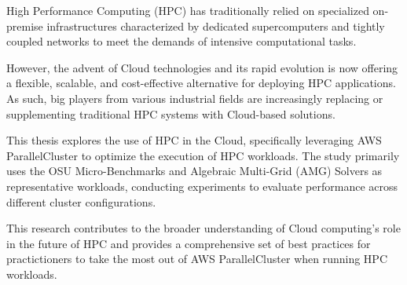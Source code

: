 %
%

High Performance Computing (HPC) has traditionally relied on specialized on-premise infrastructures characterized by dedicated supercomputers and tightly coupled networks to meet the demands of intensive computational tasks.

However, the advent of Cloud technologies and its rapid evolution is now offering a flexible, scalable, and cost-effective alternative for deploying HPC applications.
As such, big players from various industrial fields are increasingly replacing or supplementing traditional HPC systems with Cloud-based solutions.

This thesis explores the use of HPC in the Cloud, specifically leveraging AWS ParallelCluster to optimize the execution of HPC workloads.
The study primarily uses the OSU Micro-Benchmarks and Algebraic Multi-Grid (AMG) Solvers as representative workloads, conducting experiments to evaluate performance across different cluster configurations.

This research contributes to the broader understanding of Cloud computing's role in the future of HPC and provides a comprehensive set of best practices for practictioners to take the most out of AWS ParallelCluster when running HPC workloads.